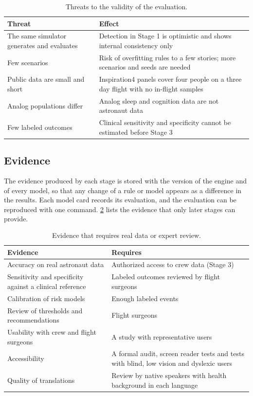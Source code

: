 \begin{table}[htbp]
\centering
\vspace{0.8em}
\caption{Threats to the validity of the evaluation.}
\label{tab:threats}
\small
\begin{tabular}{p{5.0cm}p{9.0cm}}
\hline
\textbf{Threat} & \textbf{Effect} \\
\hline
The same simulator generates and evaluates & Detection in Stage 1 is optimistic and shows internal consistency only \\
Few scenarios & Risk of overfitting rules to a few stories; more scenarios and seeds are needed \\
Public data are small and short & Inspiration4 panels cover four people on a three day flight with no in-flight samples \\
Analog populations differ & Analog sleep and cognition data are not astronaut data \\
Few labeled outcomes & Clinical sensitivity and specificity cannot be estimated before Stage 3 \\
\hline
\end{tabular}
\vspace{1.2em}
\end{table}

\subsection{Evidence}
\label{subsec:evidence}

The evidence produced by each stage is stored with the version of the engine and of every model, so that any change of a rule or model appears as a difference in the results. Each model card records its evaluation, and the evaluation can be reproduced with one command. \ref{tab:missing-evidence} lists the evidence that only later stages can provide.

\begin{table}[htbp]
\centering
\vspace{0.8em}
\caption{Evidence that requires real data or expert review.}
\label{tab:missing-evidence}
\small
\begin{tabular}{p{7.0cm}p{7.0cm}}
\hline
\textbf{Evidence} & \textbf{Requires} \\
\hline
Accuracy on real astronaut data & Authorized access to crew data (Stage 3) \\
Sensitivity and specificity against a clinical reference & Labeled outcomes reviewed by flight surgeons \\
Calibration of risk models & Enough labeled events \\
Review of thresholds and recommendations & Flight surgeons \\
Usability with crew and flight surgeons & A study with representative users \\
Accessibility & A formal audit, screen reader tests and tests with blind, low vision and dyslexic users \\
Quality of translations & Review by native speakers with health background in each language \\
\hline
\end{tabular}
\vspace{1.2em}
\end{table}
